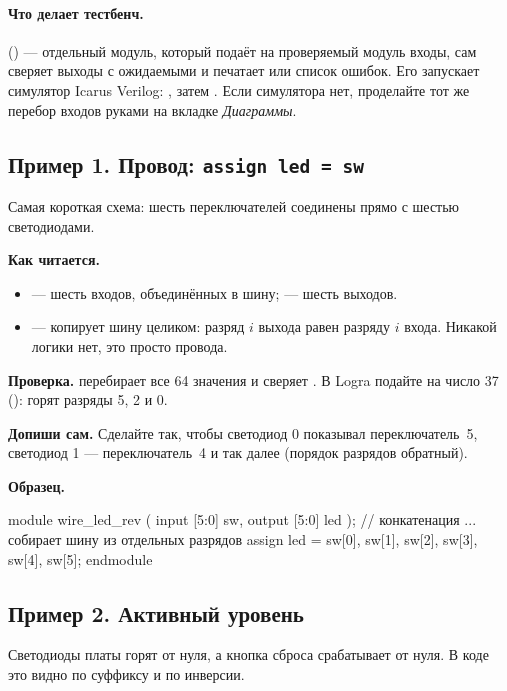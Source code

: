 \paragraph{Что делает тестбенч.}  () --- отдельный
модуль, который подаёт на проверяемый модуль входы, сам сверяет выходы с
ожидаемыми и печатает  или список ошибок. Его запускает симулятор Icarus
Verilog: , затем
. Если симулятора нет, проделайте тот же перебор входов руками на
вкладке \emph{Диаграммы}.

\subsection{Пример 1. Провод: \texttt{assign led = sw}}

Самая короткая схема: шесть переключателей соединены прямо с шестью светодиодами.


\textbf{Как читается.}
\begin{itemize}
  \item {} --- шесть входов, объединённых в шину;  --- шесть выходов.
  \item {} --- копирует шину целиком: разряд $i$ выхода равен разряду $i$ входа. Никакой логики нет, это просто провода.
\end{itemize}
\textbf{Проверка.}  перебирает все 64 значения  и
сверяет . В Logra подайте на  число 37 ():
горят разряды 5, 2 и 0.

\textbf{Допиши сам.} Сделайте так, чтобы светодиод 0 показывал переключатель~5,
светодиод 1 --- переключатель~4 и так далее (порядок разрядов обратный).

\textbf{Образец.}
\begin{vcode}
module wire_led_rev (
    input  [5:0] sw,
    output [5:0] led
);
    // конкатенация {...} собирает шину из отдельных разрядов
    assign led = {sw[0], sw[1], sw[2], sw[3], sw[4], sw[5]};
endmodule
\end{vcode}

\subsection{Пример 2. Активный уровень}

Светодиоды платы горят от нуля, а кнопка сброса срабатывает от нуля. В коде это
видно по суффиксу  и по инверсии.

